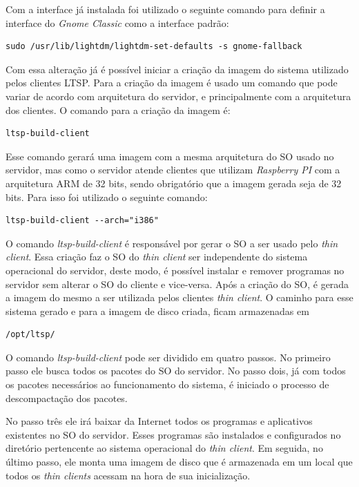 \documentclass[
	12pt,				%
	openright,			%
	twoside,			%
	a4paper,			%
	chapter=TITLE,		%
	english,			%
	brazil				%
	]{abntex2}
\begin{document}
Com a interface já instalada foi utilizado o seguinte comando para definir a interface do \textit{Gnome Classic} como a interface padrão:
\begin{verbatim}
sudo /usr/lib/lightdm/lightdm-set-defaults -s gnome-fallback
\end{verbatim}

Com essa alteração já é possível iniciar a criação da imagem do sistema utilizado pelos  clientes LTSP. Para a criação da imagem é usado um comando que pode variar de acordo com arquitetura do servidor, e principalmente com a arquitetura dos clientes. O comando para a criação da imagem é:
\begin{verbatim}
ltsp-build-client
\end{verbatim}

Esse comando gerará uma imagem com a mesma arquitetura do SO usado no servidor, mas como o servidor atende clientes que utilizam \textit{Raspberry PI} com a arquitetura ARM de 32 bits, sendo obrigatório que a imagem gerada seja de 32 bits. Para isso  foi utilizado o seguinte comando:
\begin{verbatim}
ltsp-build-client --arch="i386" 
\end{verbatim}

O comando \textit{ltsp-build-client} é responsável por gerar o SO a ser usado pelo \textit{thin client}. Essa criação faz o SO do \textit{thin client} ser independente do sistema operacional do servidor, deste modo, é possível instalar e remover programas no servidor sem alterar o SO do cliente e vice-versa. Após a criação do SO, é gerada a imagem do mesmo a ser utilizada pelos clientes \textit{thin client}. O caminho para esse sistema gerado e para a imagem de disco criada, ficam armazenadas em
\begin{verbatim}
/opt/ltsp/
\end{verbatim}

O comando \textit{ltsp-build-client} pode ser dividido em quatro passos. No primeiro passo ele busca todos os pacotes do SO do servidor. No passo dois, já com todos os pacotes necessários ao funcionamento do sistema, é iniciado o processo de descompactação dos pacotes. 

No passo três ele irá baixar da Internet todos os programas e aplicativos existentes no SO do servidor. Esses programas são instalados e configurados no diretório pertencente ao sistema operacional do \textit{thin client}.  Em seguida, no último passo, ele monta uma imagem de disco que é armazenada em um local que todos os \textit{thin clients} acessam na hora de sua inicialização.
\end{document}
